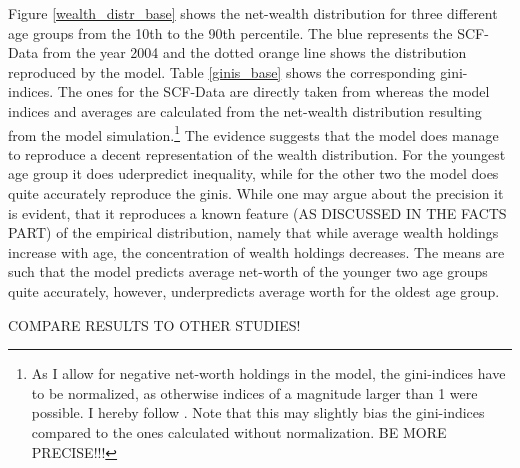 \documentclass[a4paper,12pt]{article}
\begin{document}
Figure \ref{wealth_distr_base} shows the net-wealth distribution for three different age groups from the 10th to the 90th percentile. The blue represents the SCF-Data from the year 2004 and the dotted orange line shows the distribution reproduced by the model. 
Table \ref{ginis_base} shows the corresponding gini-indices. The ones for the SCF-Data are directly taken from \cite{hintermaier2011} whereas the model indices and averages are calculated from the net-wealth distribution resulting from the model simulation.\footnote{As I allow for negative net-worth holdings in the model, the gini-indices have to be normalized, as otherwise indices of a magnitude larger than 1 were possible. I hereby follow \cite{chen1982}. Note that this may slightly bias the gini-indices compared to the ones calculated without normalization. BE MORE PRECISE!!!} The evidence suggests that the model does manage to reproduce a decent representation of the wealth distribution. For the youngest age group it does uderpredict inequality, while for the other two the model does quite accurately reproduce the ginis. While one may argue about the precision it is evident, that it reproduces a known feature (AS DISCUSSED IN THE FACTS PART) of the empirical distribution, namely that while average wealth holdings increase with age, the concentration of wealth holdings decreases. 
The means are such that the model predicts average net-worth of the younger two age groups quite accurately, however, underpredicts average worth for the oldest age group. 

COMPARE RESULTS TO OTHER STUDIES! 
\end{document}
